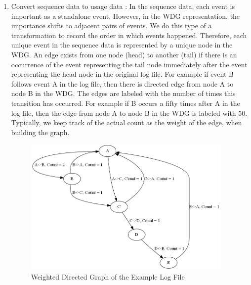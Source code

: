                 \begin{enumerate}
                \item Convert sequence data to usage data :
In the sequence data, each event is important as a standalone event. However, in the WDG representation, the importance shifts to adjacent pairs of events. We do this type of a transformation to record the order in which events happened. Therefore, each unique event in the sequence data is represented by a unique node in the WDG. An edge exists from one node (head) to another (tail) if there is an occurrence of the event representing the tail node immediately after the event representing the head node in the original log file. For example if event B follows event A in the log file, then there is directed edge from node A to node B in the WDG. The edges are labeled with the number of times this transition has occurred.  For example if B occurs a fifty times after A in the log file, then the edge from node A to node B in the WDG is labeled with 50. Typically, we keep track of the actual count as the weight of the edge, when building the graph. 
\begin{figure}[!t]
\centering
\includegraphics[width=4in]{Graphics/op-profile-example.png}
\caption{Weighted Directed Graph of the Example Log File}
\label{WDG_example}
\end{figure}


\end{enumerate}
